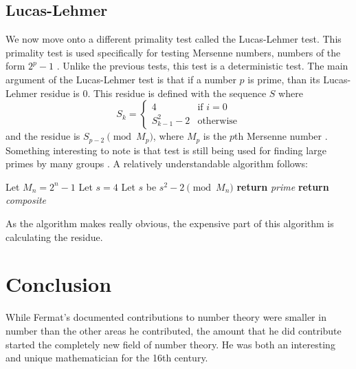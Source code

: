 \documentclass[11pt]{article}
\begin{document}
\subsection*{Lucas-Lehmer}
We now move onto a different primality test called the Lucas-Lehmer test.
This primality test is used specifically for testing Mersenne numbers, numbers
of the form $2^p -1$ \cite{MersennePrimeTests}.
Unlike the previous tests, this test is a deterministic test.
The main argument of the Lucas-Lehmer test is that if a number $p$ is prime, than
its Lucas-Lehmer residue is 0.
This residue is defined with the sequence $S$ where
\[S_k = \begin{cases} 4 &\text{if } i=0\\ S^2_{k-1} -2 &\text{otherwise}\end{cases}\]
and the residue is $S_{p-2} \pmod{M_p}$, where $M_p$ is
the $p$th Mersenne number \cite{wLucasLehmerTest}.
Something interesting to note is that test is still being used for finding
large primes by many groups \cite{qLucasLehmerTest}.
A relatively understandable algorithm follows:

\begin{algorithm}[H]
\begin{algorithmic}
    \State Let $M_n=2^n-1$
    \State Let $s=4$
        \State Let $s$ be $s^2 - 2 \pmod{M_n}$
    \EndFor
        \State \textbf{return} \emph{prime}
    \EndIf
    \State \textbf{return} \emph{composite}
    \EndProcedure
\end{algorithmic}
\end{algorithm}
As the algorithm makes really obvious, the expensive part of this algorithm is
calculating the residue.

\section*{Conclusion}
While Fermat's documented contributions to number theory were smaller in number
than the other areas he contributed, the amount that he did contribute 
started the completely new field of number theory.
He was both an interesting and unique mathematician for the 16th century.
\end{document}
